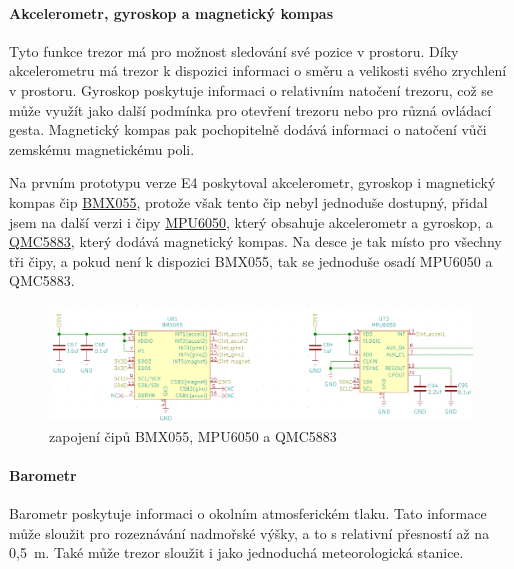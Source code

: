 \paragraph{Akcelerometr, gyroskop a magnetický kompas}
Tyto funkce trezor má pro možnost sledování své pozice v prostoru. 
Díky akcelerometru má trezor k dispozici informaci o směru a velikosti svého zrychlení v prostoru.
Gyroskop poskytuje informaci o relativním natočení trezoru, což se může využít jako další podmínka pro otevření trezoru nebo pro různá ovládací gesta.
Magnetický kompas pak pochopitelně dodává informaci o natočení vůči zemskému magnetickému poli.

Na prvním prototypu verze E4 poskytoval akcelerometr, gyroskop i magnetický kompas čip \href{https://datasheet.lcsc.com/szlcsc/Bosch-Sensortec-BMX055_C94022.pdf}{BMX055}, 
protože však tento čip nebyl jednoduše dostupný, přidal jsem na další verzi i čipy \href{https://datasheet.lcsc.com/szlcsc/TDK-InvenSense-MPU-6050_C24112.pdf}{MPU6050},
který obsahuje akcelerometr a gyroskop, a \href{https://datasheet.lcsc.com/szlcsc/QST-QMC5883L-TR_C192585.pdf}{QMC5883}, který dodává magnetický kompas.
Na desce je tak místo pro všechny tři čipy, a pokud není k dispozici BMX055, tak se jednoduše osadí MPU6050 a QMC5883. 

\begin{figure}[htbp]
    \centering
    \includegraphics[width=\textwidth]{kapitoly/obrazky/E4/vnimani/BMX-MPU.png}
    \caption{zapojení čipů BMX055, MPU6050 a QMC5883}
    \label{fig:E4-9axis}
\end{figure}

\newpage

\paragraph{Barometr}
Barometr poskytuje informaci o okolním atmosferickém tlaku. Tato informace může sloužit pro rozeznávání nadmořské výšky, a to s relativní přesností až na 0,5~m. Také může trezor sloužit 
i jako jednoduchá meteorologická stanice.

